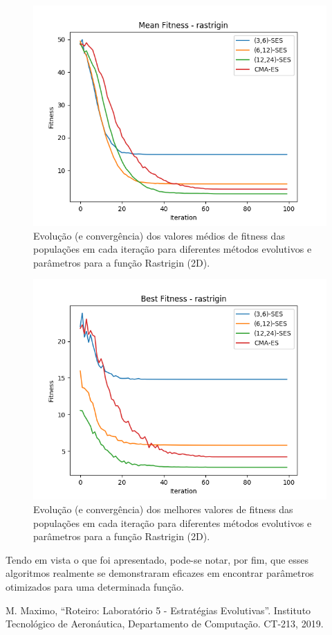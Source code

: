 \documentclass[conference]{IEEEtran}
\begin{document}
\begin{figure}[htbp]
\centering
\centerline{\includegraphics[scale=0.5]{imagens/rastrigin/mean_fitness.png}}
\caption{Evolução (e convergência) dos valores médios de fitness das populações em cada iteração para diferentes métodos evolutivos e parâmetros para a função Rastrigin (2D).}
\label{rastrigin/mean_fitness}
\end{figure}

\begin{figure}[htbp]
\centering
\centerline{\includegraphics[scale=0.5]{imagens/rastrigin/best_fitness.png}}
\caption{Evolução (e convergência) dos melhores valores de fitness das populações em cada iteração para diferentes métodos evolutivos e parâmetros para a função Rastrigin (2D).}
\label{rastrigin/best_fitness}
\end{figure}

Tendo em vista o que foi apresentado, pode-se notar, por fim, que esses algoritmos realmente se demonstraram eficazes em encontrar parâmetros otimizados para uma determinada função.

\begin{thebibliography}{00}
 M. Maximo, ``Roteiro: Laboratório 5 - Estratégias Evolutivas''. Instituto Tecnológico de Aeronáutica, Departamento de Computação. CT-213, 2019.
\end{thebibliography}
\end{document}
